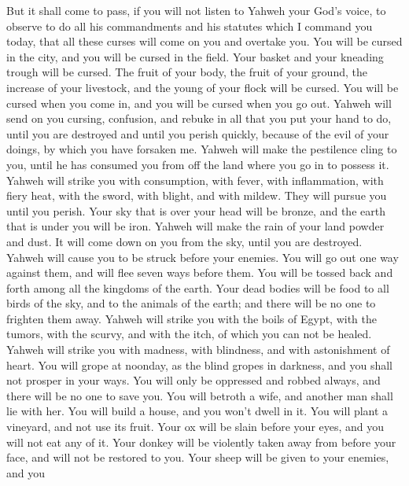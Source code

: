  But it shall come to pass, if you will not listen to
Yahweh your God's voice, to observe to do all his commandments and his
statutes which I command you today, that all these curses will come on
you and overtake you.  You will be cursed in the city,
and you will be cursed in the field.  Your basket and
your kneading trough will be cursed.  The fruit of your
body, the fruit of your ground, the increase of your livestock, and the
young of your flock will be cursed.  You will be cursed
when you come in, and you will be cursed when you go out.
 Yahweh will send on you cursing, confusion, and rebuke
in all that you put your hand to do, until you are destroyed and until
you perish quickly, because of the evil of your doings, by which you
have forsaken me.  Yahweh will make the pestilence cling
to you, until he has consumed you from off the land where you go in to
possess it.  Yahweh will strike you with consumption,
with fever, with inflammation, with fiery heat, with the sword, with
blight, and with mildew. They will pursue you until you perish.
 Your sky that is over your head will be bronze, and the
earth that is under you will be iron.  Yahweh will make
the rain of your land powder and dust. It will come down on you from the
sky, until you are destroyed.  Yahweh will cause you to
be struck before your enemies. You will go out one way against them, and
will flee seven ways before them. You will be tossed back and forth
among all the kingdoms of the earth.  Your dead bodies
will be food to all birds of the sky, and to the animals of the earth;
and there will be no one to frighten them away.  Yahweh
will strike you with the boils of Egypt, with the tumors, with the
scurvy, and with the itch, of which you can not be healed.
 Yahweh will strike you with madness, with blindness, and
with astonishment of heart.  You will grope at noonday,
as the blind gropes in darkness, and you shall not prosper in your ways.
You will only be oppressed and robbed always, and there will be no one
to save you.  You will betroth a wife, and another man
shall lie with her. You will build a house, and you won't dwell in it.
You will plant a vineyard, and not use its fruit.  Your
ox will be slain before your eyes, and you will not eat any of it. Your
donkey will be violently taken away from before your face, and will not
be restored to you. Your sheep will be given to your enemies, and you
